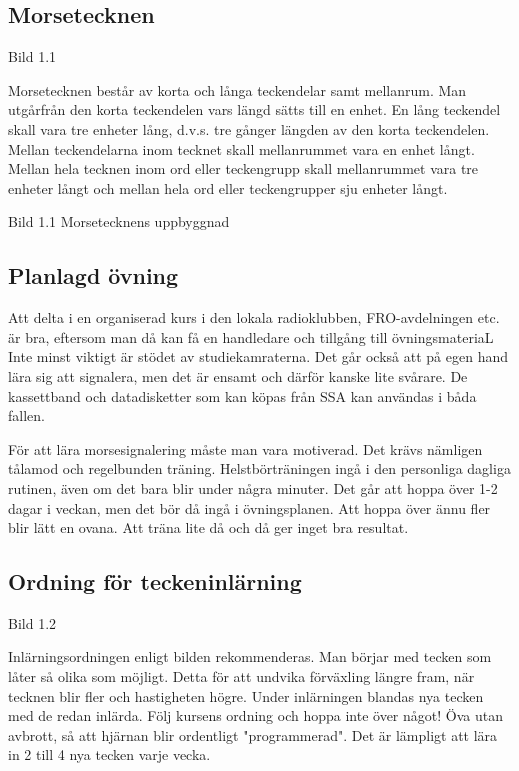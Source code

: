 \subsection{Morsetecknen}

Bild 1.1

Morsetecknen består av korta och långa teckendelar samt mellanrum. Man utgårfrån
den korta teckendelen vars längd sätts till en enhet. En lång teckendel skall
vara tre enheter lång, d.v.s. tre gånger längden av den korta
teckendelen. Mellan teckendelarna inom tecknet skall mellanrummet vara en enhet
långt. Mellan hela tecknen inom ord eller teckengrupp skall mellanrummet vara
tre enheter långt och mellan hela ord eller teckengrupper sju enheter långt.

Bild 1.1 Morsetecknens uppbyggnad

\subsection{Planlagd övning}

Att delta i en organiserad kurs i den lokala radioklubben, FRO-avdelningen etc.
är bra, eftersom man då kan få en handledare och tillgång till övningsmateriaL
Inte minst viktigt är stödet av studiekamraterna. Det går också att på egen hand
lära sig att signalera, men det är ensamt och därför kanske lite svårare. De
kassettband och datadisketter som kan köpas från SSA kan användas i båda fallen.

För att lära morsesignalering måste man vara motiverad. Det krävs nämligen
tålamod och regelbunden träning. Helstbörträningen ingå i den personliga dagliga
rutinen, även om det bara blir under några minuter. Det går att hoppa över 1-2
dagar i veckan, men det bör då ingå i övningsplanen. Att hoppa över ännu fler
blir lätt en ovana. Att träna lite då och då ger inget bra resultat.

\subsection{Ordning för teckeninlärning}

Bild 1.2

Inlärningsordningen enligt bilden rekommenderas. Man börjar med tecken som låter
så olika som möjligt. Detta för att undvika förväxling längre fram, när tecknen
blir fler och hastigheten högre. Under inlärningen blandas nya tecken med de
redan inlärda. Följ kursens ordning och hoppa inte över något! Öva utan avbrott,
så att hjärnan blir ordentligt "programmerad". Det är lämpligt att lära in 2
till 4 nya tecken varje vecka.

